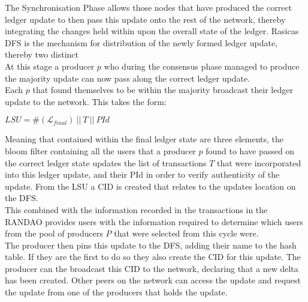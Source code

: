The Synchronisation Phase allows those nodes that have produced the correct ledger update to then pass this update onto the rest of the network, thereby integrating the changes held within upon the overall state of the ledger. Rasicas DFS is the mechanism for distribution of the newly formed ledger update, thereby two distinct \\

At this stage a producer $p$ who during the consensus phase managed to produce the majority update can now pass along the correct ledger update. \\

Each $p$ that found themselves to be within the majority broadcast their ledger update to the network. This takes the form: 

\begin{center} 
$LSU = \#(\mathcal{L}_{final})~||~T~||~PId$
\end{center} 

Meaning that contained within the final ledger state are three elements, the bloom filter containing all the users that a producer $p$ found to have passed on the correct ledger state updates the list of transactions $T$ that were incorporated into this ledger update, and their PId in order to verify authenticity of the update. From the LSU a CID is created that relates to the updates location on the DFS. \\

This combined with the information recorded in the transactions in the RANDAO provides users with the information required to determine which users from the pool of producers $P$ that were selected from this cycle were. \\

The producer then pins this update to the DFS, adding their name to the hash table. If they are the first to do so they also create the CID for this update. The producer can the broadcast this CID to the network, declaring that a new delta has been created. Other peers on the network can access the update and request the update from one of the producers that holds the update.

